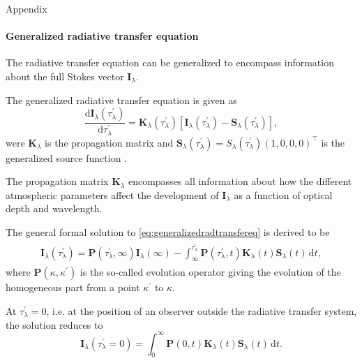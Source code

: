 \documentclass{beamer}
\newcommand\matr[1]{\ensuremath{\boldsymbol{\mathbf{#1}}}}
\newcommand\vect[1]{\ensuremath{\bm{#1}}}
\begin{document}
\begin{frame}[allowframebreaks]{Appendix}
	\framesubtitle{Generalized radiative transfer equation}
	The radiative transfer equation can be generalized to encompass information about the full Stokes vector $\vect{I}_\lambda$.
	
	The generalized radiative transfer equation is given as \begin{equation}\label{eq:generalizedradtransfereq}
		\frac{\mathrm{d}\vect{I}_\lambda(\tau_\lambda^\prime)}{\mathrm{d}\tau_\lambda^\prime} = \matr{K}_\lambda(\tau_\lambda^\prime)\left[\vect{I}_\lambda(\tau_\lambda^\prime)-\vect{S}_\lambda(\tau_\lambda^\prime)\right],
	\end{equation}
	were $\matr{K}_\lambda$ is the propagation matrix and $\vect{S}_\lambda(\tau_\lambda^\prime) = S_\lambda(\tau_\lambda^\prime)(1,0,0,0)^\top$ is the generalized source function \cite[p.150]{delToroIniesta.2003}.
	
	The propagation matrix $\matr{K}_\lambda$ encompasses all information about how the different atmospheric parameters affect the development of $\vect{I}_\lambda$ as a function of optical depth and wavelength.
	
	\newpage
	
	The general formal solution to \cref{eq:generalizedradtransfereq} is derived to be \begin{align}\label{eq:general_sol_gen_rad_transf_eq}\begin{aligned}
			\vect{I}_\lambda(\tau_\lambda^\prime) = \matr{P}\left(\tau_\lambda^\prime,\infty\right)\vect{I}_\lambda(\infty)  -\int_{\infty}^{\tau_\lambda^\prime}\matr{P}\left(\tau_\lambda^\prime,t\right)\matr{K}_\lambda(t)\vect{S}_\lambda(t)\,\mathrm{d}t,
	\end{aligned}\end{align}
	where $\matr{P}(\kappa, \kappa^\prime)$ is the so-called evolution operator giving the evolution of the homogeneous part from a point $\kappa^\prime$ to $\kappa$.
	
	At $\tau_\lambda^\prime=0$, i.e. at the position of an observer outside the radiative transfer system, the solution reduces to \begin{equation}\label{eq:gen_rad_trans_eqn_to_solve}
		\vect{I}_\lambda(\tau_\lambda^\prime = 0) = \int_{0}^\infty \matr{P}(0,t)\matr{K}_\lambda(t)\vect{S}_\lambda(t)\,\mathrm{d}t.
	\end{equation}
\end{frame}
\end{document}

